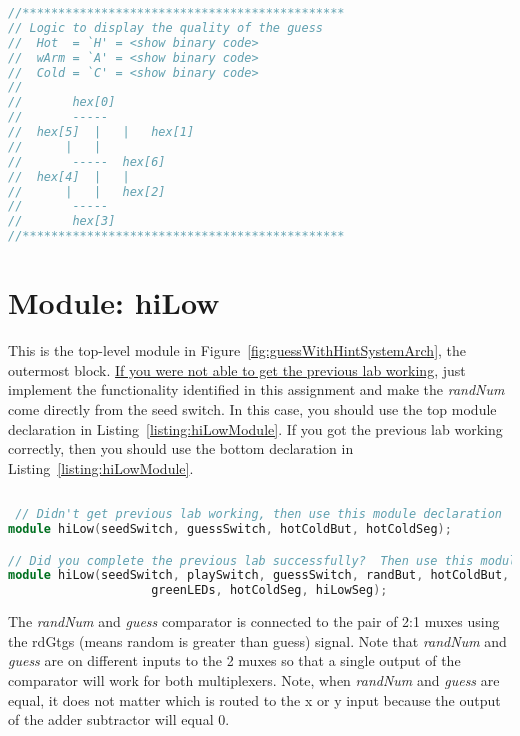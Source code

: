 \begin{lstlisting}[language=Verilog,
 caption={A comment block describing the pattern of illuminated segment for each guess hint..},
 label={listing:hotColdGuess},
 frame=single]
//*********************************************
// Logic to display the quality of the guess
//	Hot  = `H' = <show binary code>
//	wArm = `A' = <show binary code>
//	Cold = `C' = <show binary code>
//
//		 hex[0]
//		 -----
//	hex[5]	|	|	hex[1]
//		|	|	
//		 -----	hex[6]
//	hex[4]	|	|
//		|	|	hex[2]
//		 -----
//		 hex[3]
//*********************************************
\end{lstlisting}


\section{Module: hiLow}
This is the top-level module in Figure~\ref{fig:guessWithHintSystemArch}, the outermost
block. \uline{If you were not able to get the previous lab working}, just
implement the functionality identified in this assignment and make the
\emph{randNum} come directly from the seed switch. In this case, you
should use the top module declaration in Listing~\ref{listing:hiLowModule}. If you got the
previous lab working correctly, then you should use the bottom
declaration in Listing~\ref{listing:hiLowModule}.



\begin{lstlisting}[language=Verilog,
 caption={The module declaration for the enhanced hiLow module if you did or did 
 not get the previous lab working.},
 label={listing:hiLowModule},
basicstyle=\tiny\ttfamily,
 frame=single]
 
 // Didn't get previous lab working, then use this module declaration
module hiLow(seedSwitch, guessSwitch, hotColdBut, hotColdSeg);

// Did you complete the previous lab successfully?  Then use this module declaration (with no line break)
module hiLow(seedSwitch, playSwitch, guessSwitch, randBut, hotColdBut, hiLowBut, randMsbSeg, randLsbSeg, 
					greenLEDs, hotColdSeg, hiLowSeg);
 \end{lstlisting}
 
The \emph{randNum} and \emph{guess} comparator is connected to the pair of 2:1 muxes 
using the rdGtgs (means random is greater than guess) signal.
 Note that \emph{randNum} and \emph{guess} are on different
inputs to the 2 muxes so that a single output of the comparator will
work for both multiplexers. Note, when \emph{randNum} and \emph{guess}
are equal, it does not matter which is routed to the x or y input
because the output of the adder subtractor will equal 0.

